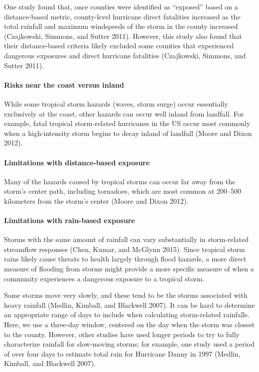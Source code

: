 \documentclass[]{elsarticle} %
\begin{document}
One study found that, once counties were identified as ``exposed'' based
on a distance-based metric, county-level hurricane direct fatalities
increased as the total rainfall and maximum windspeeds of the storm in
the county increased (Czajkowski, Simmons, and Sutter 2011). However,
this study also found that their distance-based criteria likely excluded
some counties that experienced dangerous exposures and direct hurricane
fatalities (Czajkowski, Simmons, and Sutter 2011).

\paragraph{Risks near the coast versus
inland}\label{risks-near-the-coast-versus-inland}

While some tropical storm hazards (waves, storm surge) occur essentially
exclusively at the coast, other hazards can occur well inland from
landfall. For example, fatal tropical storm-related hurricanes in the US
occur most commonly when a high-intensity storm begins to decay inland
of landfall (Moore and Dixon 2012).

\paragraph{Limitations with distance-based
exposure}\label{limitations-with-distance-based-exposure}

Many of the hazards caused by tropical storms can occur far away from
the storm's center path, including tornadoes, which are most common at
200--500 kilometers from the storm's center (Moore and Dixon 2012).

\paragraph{Limitations with rain-based
exposure}\label{limitations-with-rain-based-exposure}

Storms with the same amount of rainfall can vary substantially in
storm-related streamflow responses (Chen, Kumar, and McGlynn 2015).
Since tropical storm rains likely cause threats to health largely
through flood hazards, a more direct measure of flooding from storms
might provide a more specific measure of when a community experiences a
dangerous exposure to a tropical storm.

Some storms move very slowly, and these tend to be the storms associated
with heavy rainfall (Medlin, Kimball, and Blackwell 2007). It can be
hard to determine an appropriate range of days to include when
calculating storm-related rainfalls. Here, we use a three-day window,
centered on the day when the storm was closest to the county. However,
other studies have used longer periods to try to fully characterize
rainfall for slow-moving storms; for example, one study used a period of
over four days to estimate total rain for Hurricane Danny in 1997
(Medlin, Kimball, and Blackwell 2007).
\end{document}
